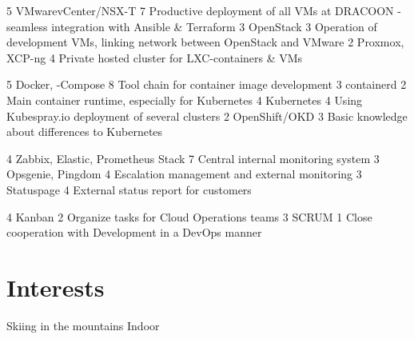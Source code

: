 \documentclass[11pt,a4paper,sans,final]{moderncv}
\begin{document}
				{5}	{VMware\newline vCenter/NSX-T}		{7}		{Productive deployment of all VMs at DRACOON - seamless integration with Ansible \& Terraform}
		\cvskillentry		{}						{3}	{OpenStack}							{3}		{Operation of development VMs, linking network between OpenStack and  VMware}
		\cvskillentry		{}						{2}	{Proxmox, XCP-ng}					{4}		{Private hosted cluster for LXC-containers \& VMs}
		
				{5}	{Docker, -Compose}					{8}		{Tool chain for container image development}
		\cvskillentry		{}						{3}	{containerd}						{2}		{Main container runtime, especially for Kubernetes}
		\cvskillentry		{}						{4}	{Kubernetes}						{4}		{Using Kubespray.io deployment of several clusters}
		\cvskillentry		{}						{2}	{OpenShift/OKD}						{3}		{Basic knowledge about differences to Kubernetes}
		
					{4}	{Zabbix, Elastic, Prometheus Stack}	{7}		{Central internal monitoring system}
		\cvskillentry		{}						{3}	{Opsgenie, Pingdom}					{4}		{Escalation management and external monitoring}
		\cvskillentry		{}						{3}	{Statuspage}						{4}		{External status report for customers}

						{4}	{Kanban}							{2}		{Organize tasks for Cloud Operations teams}
		\cvskillentry[1em]	{}						{3}	{SCRUM}								{1}		{Close cooperation with Development in a DevOps manner}
	
	\section{Interests}
			{Skiing}
				{in the mountains}
				{Indoor}
	
	\clearpage

	
\end{document}
